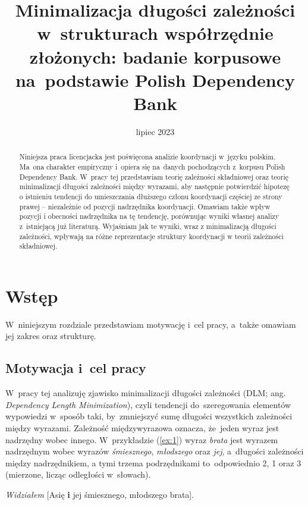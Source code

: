 \documentclass[licencjacka]{pracamgr_Kogni}
\title{Minimalizacja długości zależności w~strukturach współrzędnie złożonych: badanie korpusowe na~podstawie Polish Dependency Bank}
\date{lipiec 2023}
\begin{document}
    \maketitle


    \begin{abstract}
        {Niniejsza praca licencjacka jest poświęcona analizie koordynacji w~języku polskim. Ma~ona charakter empiryczny i~opiera się na~danych pochodzących z~korpusu Polish Dependency Bank. W~pracy tej przedstawiam teorię zależności składniowej oraz teorię minimalizacji długości zależności między wyrazami, aby następnie potwierdzić hipotezę o istnieniu tendencji do umieszczania dłuższego członu koordynacji częściej ze strony prawej -- niezależnie od pozycji nadrzędnika koordynacji. Omawiam także wpływ pozycji i obecności nadrzędnika na tę tendencję, porównując wyniki własnej analizy z~istniejącą już literaturą. Wyjaśniam jak te wyniki, wraz z minimalizacją długości zależności, wpływają na różne reprezentacje struktury koordynacji w teorii zależności składniowej.}
    \end{abstract}

    \thispagestyle{empty}
    \setcounter{page}{3}
    \tableofcontents


    \chapter{Wstęp}\label{ch:wstep}
    W~niniejszym rozdziale przedstawiam motywację i~cel pracy, a~także omawiam jej zakres oraz strukturę.


    \section{Motywacja i~cel pracy}\label{sec:motywacja-icel-pracy}

    W~pracy tej analizuję zjawisko minimalizacji długości zależności (DLM; ang. \textit{Dependency Length Minimization}), czyli tendencji do~szeregowania elementów wypowiedzi w~sposób taki, by~zmniejszyć sumę długości wszystkich zależności między wyrazami.
    Zależność międzywyrazowa oznacza, że~jeden wyraz jest nadrzędny wobec innego.
    W~przykładzie (\ref{ex:1}) wyraz \textit{brata} jest wyrazem nadrzędnym wobec wyrazów \textit{śmiesznego}, \textit{młodszego} oraz \textit{jej}, a~długości zależności między nadrzędnikiem, a tymi trzema podrzędnikami to~odpowiednio 2, 1 oraz 3 (mierzone, licząc odległości w~słowach).
    \begin{exe}
        \ex
        \textit{Widziałem} [Asię \textbf{i} jej śmiesznego, młodszego brata].
        \label {ex:1}
    \end{exe}
\end{document}
